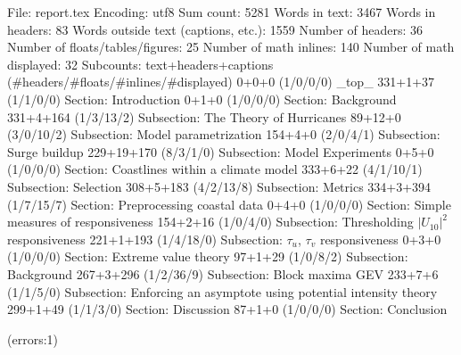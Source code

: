 
File: report.tex
Encoding: utf8
Sum count: 5281
Words in text: 3467
Words in headers: 83
Words outside text (captions, etc.): 1559
Number of headers: 36
Number of floats/tables/figures: 25
Number of math inlines: 140
Number of math displayed: 32
Subcounts:
  text+headers+captions (#headers/#floats/#inlines/#displayed)
  0+0+0 (1/0/0/0) _top_
  331+1+37 (1/1/0/0) Section: Introduction
  0+1+0 (1/0/0/0) Section: Background
  331+4+164 (1/3/13/2) Subsection: The Theory of Hurricanes
  89+12+0 (3/0/10/2) Subsection: Model parametrization
  154+4+0 (2/0/4/1) Subsection: Surge buildup
  229+19+170 (8/3/1/0) Subsection: Model Experiments
  0+5+0 (1/0/0/0) Section: Coastlines within a climate model
  333+6+22 (4/1/10/1) Subsection: Selection
  308+5+183 (4/2/13/8) Subsection: Metrics
  334+3+394 (1/7/15/7) Section: Preprocessing coastal data
  0+4+0 (1/0/0/0) Section: Simple measures of responsiveness
  154+2+16 (1/0/4/0) Subsection: Thresholding $|U_{10}|^2$ responsiveness
  221+1+193 (1/4/18/0) Subsection: $\tau_u$, $\tau_v$ responsiveness
  0+3+0 (1/0/0/0) Section: Extreme value theory
  97+1+29 (1/0/8/2) Subsection: Background
  267+3+296 (1/2/36/9) Subsection: Block maxima GEV
  233+7+6 (1/1/5/0) Subsection: Enforcing an asymptote using potential intensity theory 
  299+1+49 (1/1/3/0) Section: Discussion
  87+1+0 (1/0/0/0) Section: Conclusion

(errors:1)

